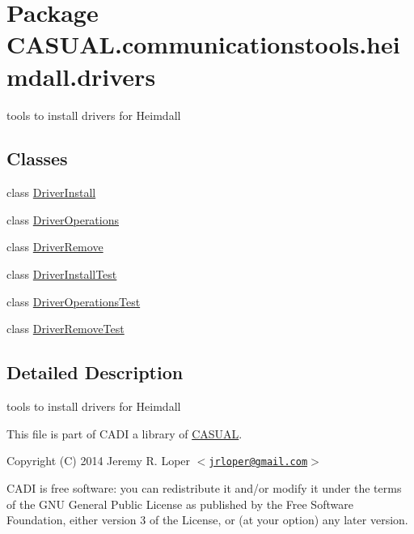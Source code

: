 \hypertarget{namespace_c_a_s_u_a_l_1_1communicationstools_1_1heimdall_1_1drivers}{\section{Package C\-A\-S\-U\-A\-L.\-communicationstools.\-heimdall.\-drivers}
\label{namespace_c_a_s_u_a_l_1_1communicationstools_1_1heimdall_1_1drivers}
}


tools to install drivers for Heimdall  


\subsection*{Classes}
\begin{DoxyCompactItemize}
\item 
class \hyperlink{class_c_a_s_u_a_l_1_1communicationstools_1_1heimdall_1_1drivers_1_1_driver_install}{Driver\-Install}
\item 
class \hyperlink{class_c_a_s_u_a_l_1_1communicationstools_1_1heimdall_1_1drivers_1_1_driver_operations}{Driver\-Operations}
\item 
class \hyperlink{class_c_a_s_u_a_l_1_1communicationstools_1_1heimdall_1_1drivers_1_1_driver_remove}{Driver\-Remove}
\item 
class \hyperlink{class_c_a_s_u_a_l_1_1communicationstools_1_1heimdall_1_1drivers_1_1_driver_install_test}{Driver\-Install\-Test}
\item 
class \hyperlink{class_c_a_s_u_a_l_1_1communicationstools_1_1heimdall_1_1drivers_1_1_driver_operations_test}{Driver\-Operations\-Test}
\item 
class \hyperlink{class_c_a_s_u_a_l_1_1communicationstools_1_1heimdall_1_1drivers_1_1_driver_remove_test}{Driver\-Remove\-Test}
\end{DoxyCompactItemize}


\subsection{Detailed Description}
tools to install drivers for Heimdall 

 This file is part of C\-A\-D\-I a library of \hyperlink{namespace_c_a_s_u_a_l}{C\-A\-S\-U\-A\-L}.

Copyright (C) 2014 Jeremy R. Loper $<$\href{mailto:jrloper@gmail.com}{\tt jrloper@gmail.\-com}$>$

C\-A\-D\-I is free software\-: you can redistribute it and/or modify it under the terms of the G\-N\-U General Public License as published by the Free Software Foundation, either version 3 of the License, or (at your option) any later version.

